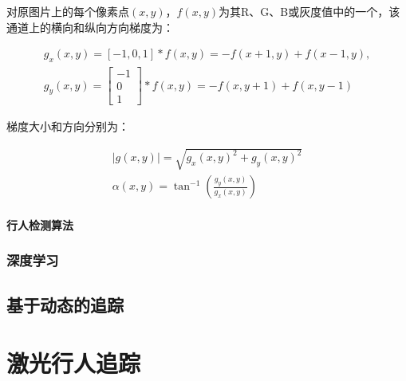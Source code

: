   对原图片上的每个像素点$(x,y)$，$f(x,y)$为其R、G、B或灰度值中的一个，该通道上的横向和纵向方向梯度为：


\begin{gather*}
g_x(x,y)=[-1,0,1]\ast f(x,y)=-f(x+1,y)+f(x-1,y),\\
g_y(x,y)=\begin{bmatrix}
-1 \\
0 \\
1
\end{bmatrix}
\ast f(x,y) = -f(x,y+1)+f(x,y-1)
\end{gather*}


  梯度大小和方向分别为：

\begin{gather*}
|g(x,y)|=\sqrt{g_x (x,y)^2 + g_y (x,y)^2} \\
\alpha (x,y)=\tan^{-1}\left(\frac{g_y(x,y)}{g_x(x,y)}\right)
\end{gather*}


\paragraph{行人检测算法}

\subsubsection{深度学习}

\subsection{基于动态的追踪}


\section{激光行人追踪}


